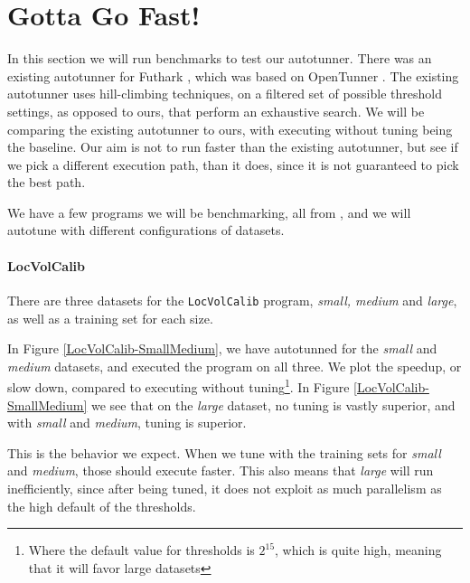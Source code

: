 \section{Gotta Go Fast!}
In this section we will run benchmarks to test our autotunner. There was an existing autotunner for Futhark \cite{oldtune}, which was based on OpenTunner \cite{opentunner}. The existing autotunner uses hill-climbing techniques, on a filtered set of possible threshold settings, as opposed to ours, that perform an exhaustive search. We will be comparing the existing autotunner to ours, with executing without tuning being the baseline. %
Our aim is not to run faster than the existing autotunner, but see if we pick a different execution path, than it does, since it is not guaranteed to pick the best path.

We have a few programs we will be benchmarking, all from \cite{ppopp}, and we will autotune with different configurations of datasets. 
\paragraph{LocVolCalib}
There are three datasets for the \texttt{LocVolCalib} program, \textit{small, medium} and \textit{large}, as well as a training set for each size.

In Figure \ref{LocVolCalib-SmallMedium}, we have autotunned for the \textit{small} and \textit{medium} datasets, and executed the program on all three. We plot the speedup, or slow down, compared to executing without tuning\footnote{Where the default value for thresholds is $2^{15}$, which is quite high, meaning that it will favor large datasets}.
In Figure \ref{LocVolCalib-SmallMedium} we see that on the \textit{large} dataset, no tuning is vastly superior, and with \textit{small} and \textit{medium}, tuning is superior.

This is the behavior we expect. When we tune with the training sets for \textit{small} and \textit{medium}, those should execute faster. This also means that \textit{large} will run inefficiently, since after being tuned, it does not exploit as much parallelism as the high default of the thresholds.   

